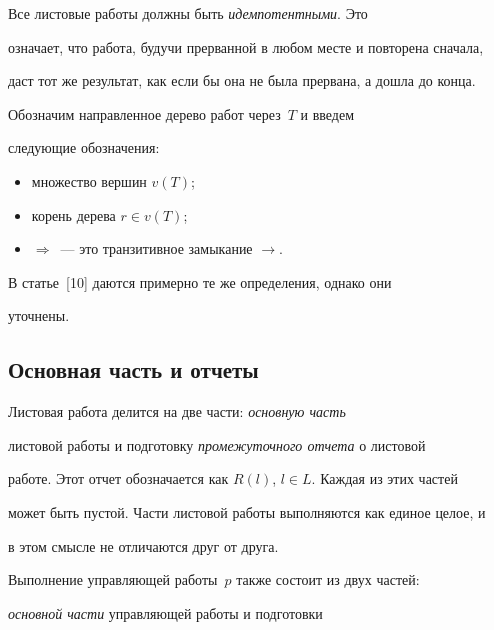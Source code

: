      Все листовые работы должны быть \textit{идемпотентными}. Это 


означает, что работа, будучи прерванной в любом месте и повторена сначала, 


даст тот же результат, как если бы она не была прервана, а дошла до конца. 


      


      Обозначим направленное дерево работ через~$T$ и введем 


следующие обозначения:


      \begin{itemize}


\item множество вершин $v(T)$; 


\item корень дерева $r\in v(T)$;


\item $\Rightarrow$~--- это транзитивное замыкание $\rightarrow$.


\end{itemize}





      В статье~[10] даются примерно те же определения, однако они 


уточнены.





\subsection{Основная часть и отчеты}





      Листовая работа делится на две части: \textit{основную часть} 


листовой работы и подготовку \textit{промежуточного отчета} о листовой 


работе. Этот отчет обозначается как $R(l)$, $l\in L$. Каждая из этих частей 


может быть пустой. Части листовой работы выполняются как единое целое, и 


в этом смысле не отличаются друг от друга.


      


      Выполнение управляющей работы~$p$ также состоит из двух частей: 


\textit{основной части} управ\-ля\-ющей работы и подготовки 


